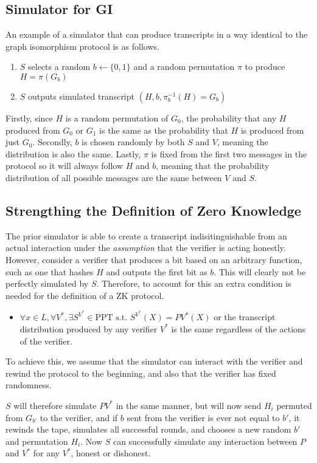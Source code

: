 \documentclass[11pt]{article}
\begin{document}
\subsection{Simulator for GI}
An example of a simulator that can produce transcripts in a way identical to the graph isomorphism protocol is as follows.
\begin{enumerate}
    \item $S$ selects a random $b \leftarrow \{0,1\}$ and a random permutation $\pi$ to produce $H = \pi(G_b)$
    \item $S$ outputs simulated transcript $(H,b,\pi^{-1}_b(H)=G_b)$
\end{enumerate}
Firstly, since $H$ is a random permutation of $G_0$, the probability that any $H$ produced from $G_0$ or $G_1$ is the same as the probability that $H$ is produced from just $G_0$. Secondly, $b$ is chosen randomly by both $S$ and $V$, meaning the distribution is also the same. Lastly, $\pi$ is fixed from the first two messages in the protocol so it will always follow $H$ and $b$, meaning that the probability distribution of all possible messages are the same between $V$ and $S$. 

\subsection{Strengthing the Definition of Zero Knowledge}
The prior simulator is able to create a transcript indisitinguishable from an actual interaction under the \textit{assumption} that the verifier is acting honestly. However, consider a verifier that produces a bit based on an arbitrary function, such as one that hashes $H$ and outputs the first bit as $b$. This will clearly not be perfectly simulated by $S$. Therefore, to account for this an extra condition is needed for the definition of a ZK protocol.
\begin{itemize}
    \item $\forall x \in L, \forall V^*, \exists S^{V^*} \in \text{PPT s.t. } S^{V^*}(X) = PV^*(X)$ or the transcript distribution produced by any verifier $V^*$ is the same regardless of the actions of the verifier.
\end{itemize}
To achieve this, we assume that the simulator can interact with the verifier and rewind the protocol to the beginning, and also that the verifier has fixed randomness.
\vspace{1em}

$S$ will therefore simulate $PV^*$ in the same manner, but will now send $H_i$ permuted from $G_{b'}$ to the verifier, and if $b$ sent from the verifier is ever not equal to $b'$, it rewinds the tape, simulates all successful rounds, and chooses a new random $b'$ and permutation $H_i$. Now $S$ can successfully simulate any interaction between $P$ and $V^*$ for any $V^*$, honest or dishonest.
\end{document}
